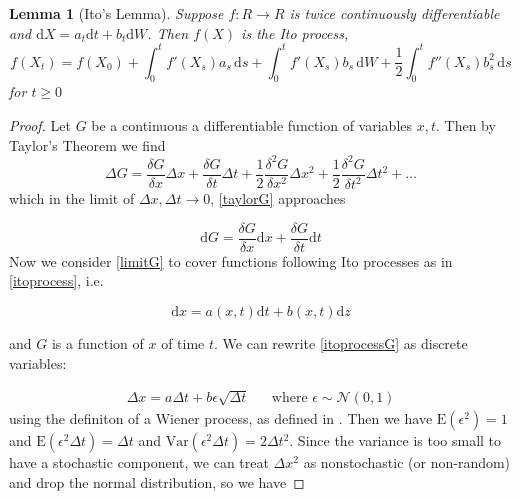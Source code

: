 \documentclass[11pt]{article} %
\newtheorem{lemma}[theorem]{Lemma}
\begin{document}
\begin{lemma}[Ito's Lemma] 
    \label{itolemma}
    Suppose $f: R \to R$ is twice continuously differentiable and 
    $\mathrm{d}X = a_t\mathrm{d}t + b_t\mathrm{d}W$. Then $f(X)$ is the Ito process,
    \begin{equation}
        f(X_t)
        = f(X_0) + \int_0^t \! f'(X_s)a_s \, \mathrm{d}s + 
        \int_0^t \! f'(X_s)b_s \, \mathrm{d}W + \frac{1}{2}\int_0^t \! f''(X_s)b_s^2 \,
         \mathrm{d}s
    \end{equation}
    for $t\ge0$
\end{lemma}
\begin{proof}
    Let $G$ be a continuous a differentiable function of variables $x, t$. 
    Then by Taylor's Theorem we find
    \begin{equation}\label{taylorG}
        \Delta G = \frac{\delta G}{\delta x}\Delta x + 
        \frac{\delta G}{\delta t}\Delta t + 
        \frac{1}{2} \frac{\delta^2 G}{\delta x^2}\Delta x^2 + 
        \frac{1}{2} \frac{\delta^2 G}{\delta t^2}\Delta t^2 + \dots
    \end{equation}
    which in the limit of $\Delta x, \Delta t \to 0$, \eqref{taylorG} approaches

    \begin{equation}\label{limitG}
        \mathrm{d}G = \frac{\delta G}{\delta x}\mathrm{d}x + 
        \frac{\delta G}{\delta t}\mathrm{d}t
    \end{equation}
    Now we consider \eqref{limitG} to cover functions following Ito processes as 
    in \eqref{itoprocess}, i.e.

    \begin{equation}\label{itoprocessG}
        \mathrm{d}x = a(x,t)\mathrm{d}t + b(x,t)\mathrm{d}z
    \end{equation}

    and $G$ is a function of $x$ of time $t$. We can rewrite \eqref{itoprocessG} 
    as discrete variables:

    \begin{align}
        \Delta x = a\Delta t + b \epsilon \sqrt{\Delta t}
         && \text{where $\epsilon \sim \mathcal{N}(0,1)$}
    \end{align}
using the definiton of a Wiener process, as defined in \cite{optionsderivatives}. 
Then we have $\mathrm{E}(\epsilon^2) = 1$  and $\mathrm{E}(\epsilon^2  \Delta t) =
 \Delta t$ and $\mathrm{Var}(\epsilon^2  \Delta t) = 2\Delta t ^2$. Since the variance 
 is too small to have a stochastic component, we can treat $\Delta x ^2$ as nonstochastic 
(or non-random) and drop the normal distribution, so we have 


\end{proof}
\end{document}

